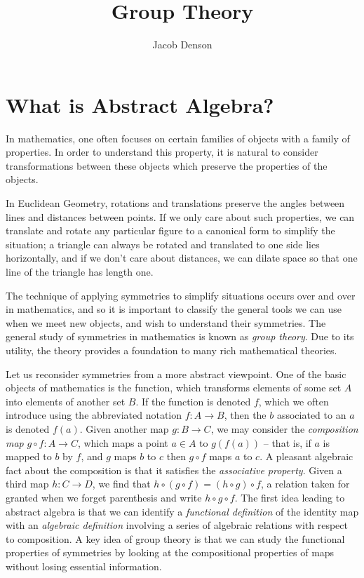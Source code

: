 

\title{Group Theory}
\author{Jacob Denson}



\maketitle
\tableofcontents
{}

\chapter{What is Abstract Algebra?}

In mathematics, one often focuses on certain families of objects with a family of properties. In order to understand this property, it is natural to consider transformations between these objects which preserve the properties of the objects.

\begin{example}
In Euclidean Geometry, rotations and translations preserve the angles between lines and distances between points. If we only care about such properties, we can translate and rotate any particular figure to a canonical form to simplify the situation; a triangle can always be rotated and translated to one side lies horizontally, and if we don't care about distances, we can dilate space so that one line of the triangle has length one.
\end{example}

The technique of applying symmetries to simplify situations occurs over and over in mathematics, and so it is important to classify the general tools we can use when we meet new objects, and wish to understand their symmetries. The general study of symmetries in mathematics is known as {\it group theory}. Due to its utility, the theory provides a foundation to many rich mathematical theories.

Let us reconsider symmetries from a more abstract viewpoint. One of the basic objects of mathematics is the function, which transforms elements of some set $A$ into elements of another set $B$. If the function is denoted $f$, which we often introduce using the abbreviated notation $f: A \to B$, then the $b$ associated to an $a$ is denoted $f(a)$. Given another map $g: B \to C$, we may consider the \emph{composition map} $g \circ f: A \to C$, which maps a point $a \in A$ to $g(f(a))$ -- that is, if $a$ is mapped to $b$ by $f$, and $g$ maps $b$ to $c$ then $g \circ f$ maps $a$ to $c$. A pleasant algebraic fact about the composition is that it satisfies the \emph{associative property}. Given a third map $h:C \to D$, we find that $h \circ (g \circ f) = (h \circ g) \circ f$, a relation taken for granted when we forget parenthesis and write $h \circ g \circ f$. The first idea leading to abstract algebra is that we can identify a {\it functional definition} of the identity map with an {\it algebraic definition} involving a series of algebraic relations with respect to composition. A key idea of group theory is that we can study the functional properties of symmetries by looking at the compositional properties of maps without losing essential information.

